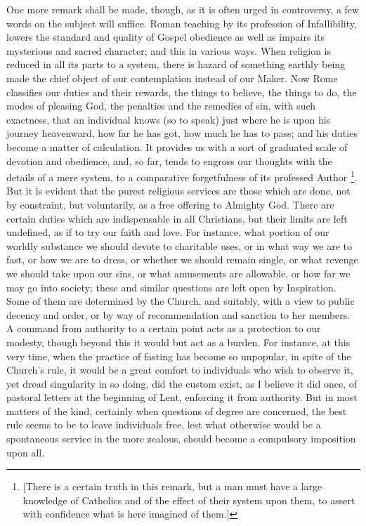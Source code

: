 One more remark shall be made, though, as it is often urged in
controversy, a few words on the subject will suffice. Roman teaching
by its profession of Infallibility, lowers the standard and quality of
Gospel obedience as well as impairs its mysterious and sacred
character; and this in various ways. When religion is reduced in all
its parts to a system, there is hazard of something earthly being made
the chief object of our contemplation instead of our Maker. Now Rome
classifies our duties and their rewards, the things to believe, the
things to do, the modes of pleasing God, the penalties and the
remedies of sin, with such exactness, that an individual knows (so to
speak) just where he is upon his journey heavenward, how far he has
got, how much he has to pass; and his duties become a matter of
calculation. It provides us with a sort of graduated scale of devotion
and obedience, and, so far, tends to engross our thoughts with the
details of a mere system, to a comparative forgetfulness of its
professed Author \footnote{[There is a certain truth in this remark,
but a man must have a large knowledge of Catholics and of the effect
of their system upon them, to assert with confidence what is here
imagined of them.]}. But
it is evident that the purest religious services are those which are
done, not by constraint, but voluntarily, as a free offering to
Almighty God. There are certain duties which are indispensable in all
Christians, but their limits are left undefined, as if to try our
faith and love. For instance, what portion of our worldly substance we
should devote to charitable uses, or in what way we are to fast, or
how we are to dress, or whether we should remain single, or what
revenge we should take upon our sins, or what amusements are
allowable, or how far we may go into society; these and similar
questions are left open by Inspiration. Some of them are determined by
the Church, and suitably, with a view to public decency and order, or
by way of recommendation and sanction to her members. A command from
authority to a certain point acts as a protection to our modesty,
though beyond this it would but act as a burden. For instance, at this
very time, when the practice of fasting has become so unpopular, in
spite of the Church's rule, it would be a great comfort to individuals
who wish to observe it, yet dread singularity in so doing, did the
custom exist, as I believe it did once, of pastoral letters at the
beginning of Lent, enforcing it from authority. But in most matters of
the kind, certainly when questions of degree are concerned, the best
rule seems to be to leave individuals free, lest what otherwise would
be a spontaneous service in the more zealous, should become a
compulsory imposition upon all.


